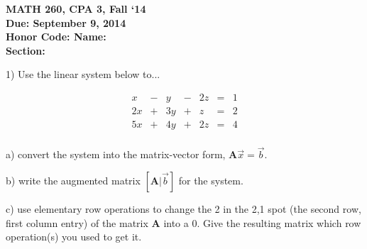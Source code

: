 \documentclass{article}
\begin{document}
\begin{flushleft}
	\bfseries{MATH 260, CPA 3, Fall `14}\\
	\bfseries{Due: September 9, 2014}\\
	\bfseries{Honor Code:} \hspace{3.5in}\bfseries{Name:}\\
	\hspace{4.37in}\bfseries{Section:}
\end{flushleft}
\begin{flushleft}
\vspace{.25in}

1) Use the linear system below to...

\begin{center}
\begin{equation*}
\begin{array}{ccccccr}
 x & - &  y & - & 2z & = & 1\\
2x & + & 3y & + &  z & = & 2\\
5x & + & 4y & + & 2z & = & 4\\
\end{array}
\end{equation*}
\end{center}

a) convert the system into the matrix-vector form, $\textbf{A}\vec{x} = \vec{b}$.

\vspace{1in}

b) write the augmented matrix $[\textbf{A}|\vec{b}]$ for the system.

\vspace{1.5in}

c) use elementary row operations to change the 2 in the 2,1 spot (the second row, first column entry) of the matrix $\textbf{A}$ into a 0.  Give the resulting matrix which row operation(s) you used to get it.

\end{flushleft}
\end{document}
